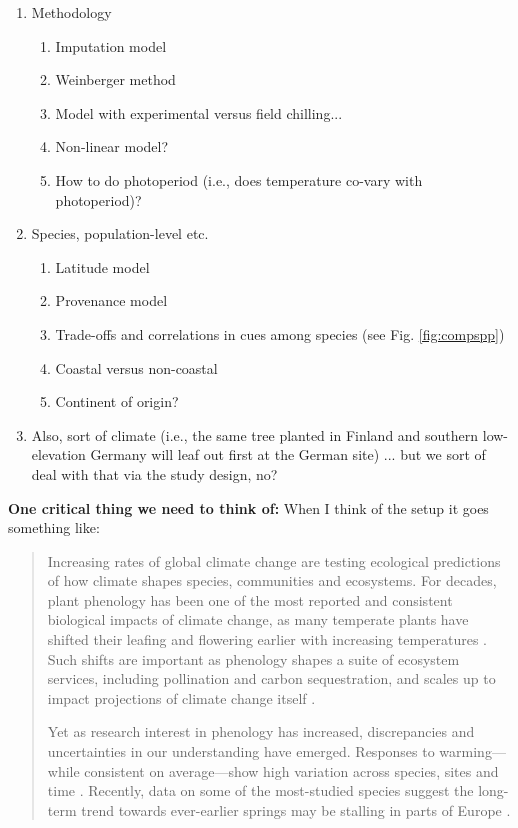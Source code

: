 \documentclass[11pt,letterpaper]{article}
\begin{document}
\begin{enumerate}
\begin{enumerate}
\item Methodology
\begin{enumerate}
\item Imputation model
\item Weinberger method
\item Model with experimental versus field chilling...
\item Non-linear model?
\item How to do photoperiod (i.e., does temperature co-vary with photoperiod)?
\end{enumerate}
\item Species, population-level etc.
\begin{enumerate}
\item Latitude model
\item Provenance model
\item Trade-offs and correlations in cues among species (see Fig. \ref{fig:compspp})
\item Coastal versus non-coastal
\item Continent of origin?
\end{enumerate}
\item Also, sort of climate (i.e., the same tree planted in Finland and southern low-elevation Germany will leaf out first at the German site) ... but we sort of deal with that via the study design, no?
\end{enumerate}
\end{enumerate}


{\bf One critical thing we need to think of:} When I think of the setup it goes something like:
\begin{quote}
Increasing rates of global climate change are testing ecological predictions of how climate shapes species, communities and ecosystems. For decades, plant phenology has been one of the most reported and consistent biological impacts of climate change, as many temperate plants have shifted their leafing and flowering earlier with increasing temperatures \citep{Wolkovich:2012n,IPCC:2014sm}. Such shifts are important as phenology shapes a suite of ecosystem services, including pollination and carbon sequestration, and scales up to impact projections of climate change itself \citep{Cleland:2007or}. 

Yet as research interest in phenology has increased, discrepancies and uncertainties in our understanding have emerged. Responses to warming---while consistent on average---show high variation across species, sites and time \citep{tansley}. Recently, data on some of the most-studied species suggest the long-term trend towards ever-earlier springs may be stalling in parts of Europe \citep{fu2015}. 
\end{quote}
\end{document}
